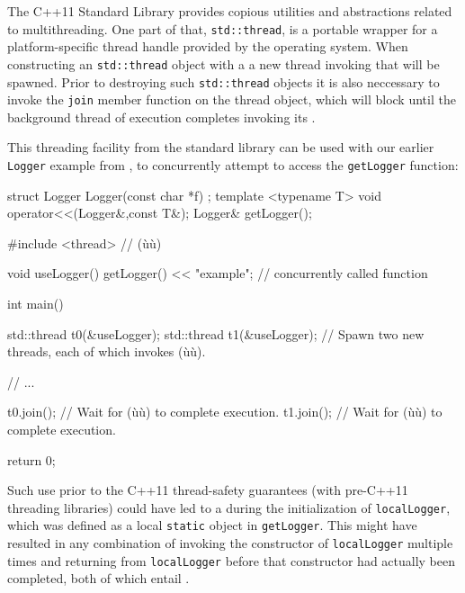 The C++11 Standard Library provides copious utilities and abstractions related
to multithreading. One part of that, \lstinline!std::thread!, is a portable
wrapper for a platform-specific thread handle provided by the
operating system. When constructing an \lstinline!std::thread! object
with a  a new thread
invoking that  will be spawned.   Prior to destroying such
\lstinline!std::thread! objects it is also neccessary to invoke the
\lstinline!join! member function on the thread object, which will block until
the background thread of execution completes invoking its .

This threading facility from the standard library can be used
with our earlier \lstinline!Logger! example from ,
to concurrently attempt to access the \lstinline!getLogger! function:

\begin{emcppshiddenlisting}[emcppsbatch={e6,e15}]
struct Logger {
  Logger(const char *f) {}
};
template <typename T>
void operator<<(Logger&,const T&);
Logger& getLogger();
\end{emcppshiddenlisting}
\begin{emcppslisting}[emcppsbatch=e6]
#include <thread>  // (ù{}ù)

void useLogger() { getLogger() << "example"; }  // concurrently called function

int main()
{
    std::thread t0(&useLogger);
    std::thread t1(&useLogger);
        // Spawn two new threads, each of which invokes (ù{}ù).

    // ...

    t0.join();  // Wait for (ù{}ù) to complete execution.
    t1.join();  // Wait for (ù{}ù) to complete execution.

    return 0;
}
\end{emcppslisting}

Such use prior to the C++11 thread-safety guarantees (with pre-C++11 threading libraries) could
have led to a  during the initialization of
\lstinline!localLogger!, which was defined as a local \lstinline!static!
object in \lstinline!getLogger!.   This might have resulted in any combination of
invoking the constructor of \lstinline!localLogger! multiple times and returning from
\lstinline!localLogger! before that constructor had actually been completed, both
of which entail .

